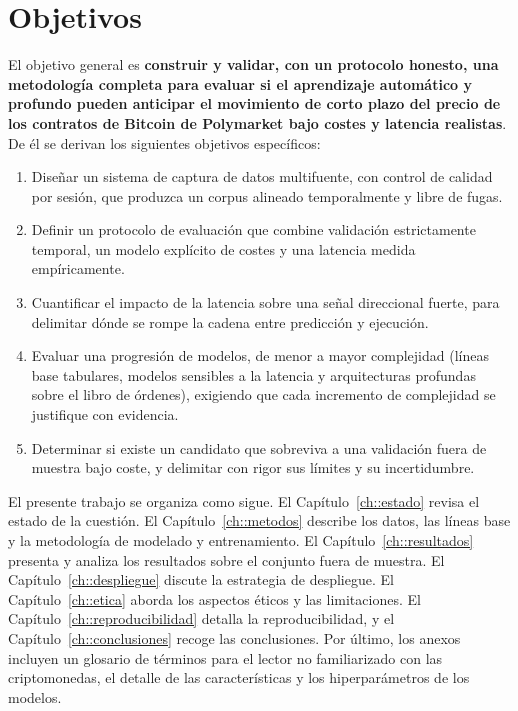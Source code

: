\section{Objetivos}

El objetivo general es \textbf{construir y validar, con un protocolo honesto, una
metodología completa para evaluar si el aprendizaje automático y profundo pueden anticipar
el movimiento de corto plazo del precio de los contratos de Bitcoin de Polymarket bajo
costes y latencia realistas}. De él se derivan los siguientes objetivos específicos:

\begin{enumerate}[noitemsep]
  \item Diseñar un sistema de captura de datos multifuente, con control de calidad por
  sesión, que produzca un corpus alineado temporalmente y libre de fugas.
  \item Definir un protocolo de evaluación que combine validación estrictamente temporal,
  un modelo explícito de costes y una latencia medida empíricamente.
  \item Cuantificar el impacto de la latencia sobre una señal direccional fuerte, para
  delimitar dónde se rompe la cadena entre predicción y ejecución.
  \item Evaluar una progresión de modelos, de menor a mayor complejidad (líneas base
  tabulares, modelos sensibles a la latencia y arquitecturas profundas sobre el libro de
  órdenes), exigiendo que cada incremento de complejidad se justifique con evidencia.
  \item Determinar si existe un candidato que sobreviva a una validación fuera de muestra
  bajo coste, y delimitar con rigor sus límites y su incertidumbre.
\end{enumerate}

El presente trabajo se organiza como sigue. El Capítulo~\ref{ch::estado} revisa el estado
de la cuestión. El Capítulo~\ref{ch::metodos} describe los datos, las líneas base y la
metodología de modelado y entrenamiento. El Capítulo~\ref{ch::resultados} presenta y
analiza los resultados sobre el conjunto fuera de muestra. El Capítulo~\ref{ch::despliegue}
discute la estrategia de despliegue. El Capítulo~\ref{ch::etica} aborda los aspectos éticos
y las limitaciones. El Capítulo~\ref{ch::reproducibilidad} detalla la reproducibilidad, y
el Capítulo~\ref{ch::conclusiones} recoge las conclusiones. Por último, los anexos incluyen
un glosario de términos para el lector no familiarizado con las criptomonedas, el detalle de
las características y los hiperparámetros de los modelos.
